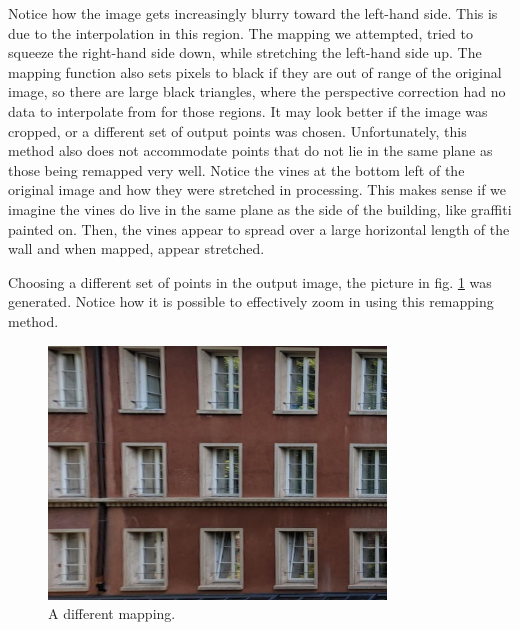 \documentclass[11pt,a4paper]{article}
\begin{document}
\clearpage

Notice how the image gets increasingly blurry toward the left-hand side. This is due to the interpolation in this region. The mapping we attempted, tried to squeeze the right-hand side down, while stretching the left-hand side up. The mapping function also sets pixels to black if they are out of range of the original image, so there are large black triangles, where the perspective correction had no data to interpolate from for those regions. It may look better if the image was cropped, or a different set of output points was chosen. Unfortunately, this method also does not accommodate points that do not lie in the same plane as those being remapped very well. Notice the vines at the bottom left of the original image and how they were stretched in processing. This makes sense if we imagine the vines do live in the same plane as the side of the building, like graffiti painted on. Then, the vines appear to spread over a large horizontal length of the wall and when mapped, appear stretched.

Choosing a different set of points in the output image, the picture in fig. \ref{fig:map2} was generated. Notice how it is possible to effectively zoom in using this remapping method.

\begin{figure}[ht]
	\centering
	\includegraphics[width=0.8\textwidth]{out2}
	\caption{A different mapping.}
	\label{fig:map2}
\end{figure}
\end{document}
